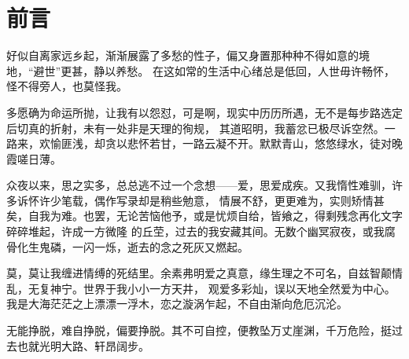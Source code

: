 \part{前言}

\vspace*{2\ccwd}

\hspace*{2em} 好似自离家远乡起，渐渐展露了多愁的性子，偏又身置那种种不得如意的境地，“避世”更甚，静以养愁。
在这如常的生活中心绪总是低回，人世毋许畅怀，怪不得旁人，也莫怪我。

\vspace*{\ccwd}

\hspace*{2em} 多愿确为命运所抛，让我有以怨怼，可是啊，现实中历历所遇，无不是每步路选定后切真的折射，未有一处非是天理的徇规，
其道昭明，我蓄忿已极尽诉空然。一路来，欢愉匪浅，却贪以悲怀若甘，一路云凝不开。默默青山，悠悠绿水，徒对晚霞嗟日薄。

\vspace*{\ccwd}

\hspace*{2em} 众夜以来，思之实多，总总逃不过一个念想——爱，思爱成疾。又我惰性难驯，许多诉怀许少笔载，偶作写录却是稍些勉意，
情展不舒，更更难为，实则矫情甚矣，自我为难。也罢，无论苦恼他予，或是忧烦自给，皆飨之，得剩残念再化文字碎碎堆起，许成一方微隆
的丘茔，过去的我安藏其间。无数个幽冥寂夜，或我腐骨化生鬼磷，一闪一烁，逝去的念之死灰又燃起。

\vspace*{\ccwd}

\hspace*{2em} 莫，莫让我缠进情缚的死结里。余素弗明爱之真意，缘生理之不可名，自兹智颠情乱，无复神宁。世界于我小小一方天井，
观爱多彩灿，误以天地全然爱为中心。我是大海茫茫之上漂漂一浮木，恋之漩涡乍起，不自由渐向危厄沉沦。

\vspace*{\ccwd}

\hspace*{2em} 无能挣脱，难自挣脱，偏要挣脱。其不可自控，便教坠万丈崖渊，千万危险，挺过去也就光明大路、轩昂阔步。

\newpage